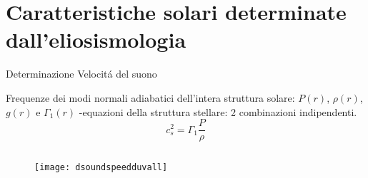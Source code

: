\section{Caratteristiche solari determinate dall'eliosismologia}

\begin{frame}{Determinazione Velocit\'a del suono}

Frequenze dei modi normali adiabatici dell'intera struttura solare: $P(r)$, $\rho(r)$, $g(r)$ e $\Gamma_1(r)$ -equazioni della struttura stellare: 2 combinazioni indipendenti. \begin{equation}
c_s^2=\Gamma_1\frac{P}{\rho}
\end{equation}


\begin{columns}
\begin{column}{0.5\textwidth}
\begin{figure}[!ht]
\texttt{[image: dsoundspeedduvall]} 
\end{figure}
\end{column}
\begin{column}{0.5\textwidth}
\label{dsoundduvall}
\end{column}
\end{columns}

    
\end{frame}


